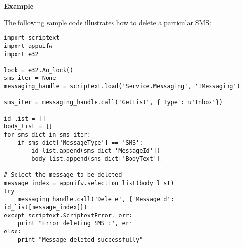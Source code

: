 {\bf Example} \break

The following sample code illustrates how to delete a particular SMS:

\begin{verbatim}
import scriptext
import appuifw
import e32

lock = e32.Ao_lock()
sms_iter = None
messaging_handle = scriptext.load('Service.Messaging', 'IMessaging')

sms_iter = messaging_handle.call('GetList', {'Type': u'Inbox'})

id_list = []
body_list = []
for sms_dict in sms_iter:
    if sms_dict['MessageType'] == 'SMS':
        id_list.append(sms_dict['MessageId'])
        body_list.append(sms_dict['BodyText'])

# Select the message to be deleted
message_index = appuifw.selection_list(body_list)
try:
    messaging_handle.call('Delete', {'MessageId': id_list[message_index]})
except scriptext.ScriptextError, err:
    print "Error deleting SMS :", err
else:
    print "Message deleted successfully"
\end{verbatim}



































 




































































